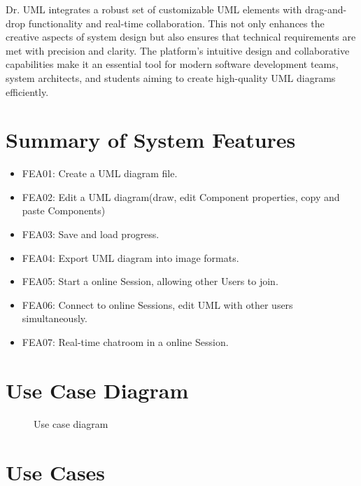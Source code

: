 \documentclass[12pt]{article}
\begin{document}
    Dr. UML integrates a robust set of customizable UML elements with drag-and-drop functionality and real-time collaboration. This not only enhances the creative aspects of system design but also ensures that technical requirements are met with precision and clarity. The platform's intuitive design and collaborative capabilities make it an essential tool for modern software development teams, system architects, and students aiming to create high-quality UML diagrams efficiently.




    \section{Summary of System Features}

    \begin{itemize}
        \item FEA01: Create a UML diagram file.
        \item FEA02: Edit a UML diagram(draw, edit Component properties, copy and paste Components)
        \item FEA03: Save and load progress.
        \item FEA04: Export UML diagram into image formats.
        \item FEA05: Start a online Session, allowing other Users to join.
        \item FEA06: Connect to online Sessions, edit UML with other users simultaneously.
        \item FEA07: Real-time chatroom in a online Session.
    \end{itemize}


    \section{Use Case Diagram}

    \begin{figure}[htbp]
        \centering
        
        \caption{Use case diagram}
    \end{figure}


    \section{Use Cases}
\end{document}
